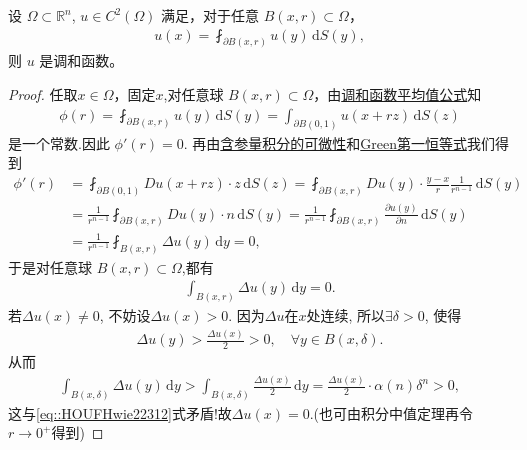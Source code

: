 \documentclass[../../main.tex]{subfiles}%
\begin{document}
\begin{theorem}\label{theorem:调和函数平均值定理逆命题}
设 $\Omega\subset \mathbb{R}^n$, $u\in C^2(\Omega)$ 满足，对于任意 $B(x,r)\subset\Omega$，
\begin{align*}
u(x) = \fint_{\partial B(x,r)} u(y)\,\mathrm{d}S(y),
\end{align*}
则 $u$ 是调和函数。
\end{theorem}
\begin{proof}
任取$x\in\Omega$，固定$x$,对任意球 $B(x,r)\subset\Omega$，由\hyperref[theorem:调和函数平均值公式]{调和函数平均值公式}知
\begin{align*}
\phi(r) = \fint_{\partial B(x,r)} u(y)\,\mathrm{d}S(y)= \int_{\partial B(0,1)} u(x+rz)\,\mathrm{d}S(z)
\end{align*}
是一个常数.因此
$\phi'(r) = 0.$
再由\hyperref[Basis of Analytics-theorem:含参量积分的可微性1]{含参量积分的可微性}和\hyperref[Basis of Analytics-theorem:Green第一恒等式]{Green第一恒等式}我们得到
\begin{align*}
\phi'(r) &= \fint_{\partial B(0,1)} D u(x+rz)\cdot z\,\mathrm{d}S(z)
= \fint_{\partial B(x,r)} D u(y)\cdot \frac{y-x}{r}\frac{1}{r^{n-1}}\,\mathrm{d}S(y) \\
&= \frac{1}{r^{n-1}}\fint_{\partial B(x,r)} D u(y)\cdot n\,\mathrm{d}S(y) = \frac{1}{r^{n-1}}\fint_{\partial B(x,r)} \frac{\partial u(y)}{\partial n}\,\mathrm{d}S(y) \\
&= \frac{1}{r^{n-1}}\fint_{B(x,r)} \Delta u(y)\,\mathrm{d}y = 0,
\end{align*}
于是对任意球 $B(x,r)\subset\Omega$,都有
\begin{align}\label{eq::HOUFHwie22312}
\int_{B(x,r)} \Delta u(y)\,\mathrm{d}y = 0.
\end{align}
若$\Delta u\left( x \right) \ne 0$, 不妨设$\Delta u\left( x \right) >0$. 因为$\Delta u$在$x$处连续, 所以$\exists \delta >0$, 使得
\begin{align*}
\Delta u\left( y \right) >\frac{\Delta u\left( x \right)}{2}>0,\quad \forall y\in B\left( x,\delta \right).
\end{align*}
从而
\begin{align*}
\int_{B\left( x,\delta \right)}\Delta u\left( y \right)\,\mathrm{d}y>\int_{B\left( x,\delta \right)}\frac{\Delta u\left( x \right)}{2}\,\mathrm{d}y=\frac{\Delta u\left( x \right)}{2}\cdot \alpha \left( n \right)\delta ^n>0,
\end{align*}
这与\eqref{eq::HOUFHwie22312}式矛盾!故$\Delta u(x)=0.$(也可由积分中值定理再令$r\to 0^+$得到)\end{proof}
\end{document}
